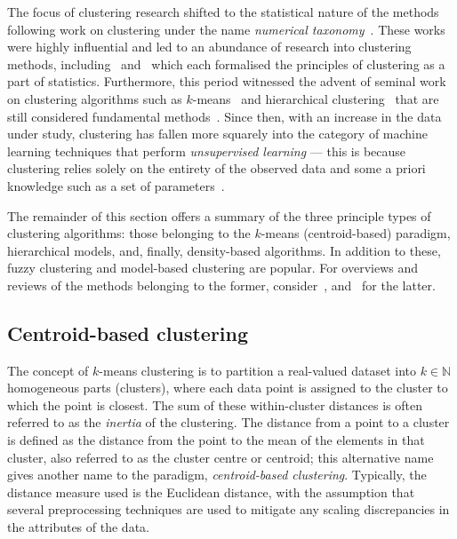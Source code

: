 The focus of clustering research shifted to the statistical nature of the
methods following work on clustering under the name \emph{numerical
taxonomy}~\cite{Sneath1973,Sokal1966}. These works were highly influential and
led to an abundance of research into clustering methods,
including~\cite{Diday1976} and~\cite{Hartigan1975} which each formalised the
principles of clustering as a part of statistics. Furthermore, this period
witnessed the advent of seminal work on clustering algorithms such as
\(k\)-means~\cite{Hartigan1979} and hierarchical
clustering~\cite{Defays1977,Sibson1973} that are still considered fundamental
methods~\cite{Aggarwal2013,Wu2009}. Since then, with an increase in the data
under study, clustering has fallen more squarely into the category of machine
learning techniques that perform \emph{unsupervised learning} --- this is
because clustering relies solely on the entirety of the observed data and some a
priori knowledge such as a set of parameters~\cite{Dayan1999}.

The remainder of this section offers a summary of the three principle types of
clustering algorithms: those belonging to the \(k\)-means (centroid-based)
paradigm, hierarchical models, and, finally, density-based algorithms. In
addition to these, fuzzy clustering and model-based clustering are popular. For
overviews and reviews of the methods belonging to the former,
consider~\cite{Ferraro2019,Gosain2016,Li2016},
and~\cite{Bouveyron2019,Fruhwirth2019,McNicholas2016} for the latter.

\subsection{Centroid-based clustering}\label{subsec:kmeans}

The concept of \(k\)-means clustering is to partition a
real-valued dataset into \(k \in \mathbb N\) homogeneous parts (clusters), where
each data point is assigned to the cluster to which the point is closest. The
sum of these within-cluster distances is often referred to as the \emph{inertia}
of the clustering. The distance from a point to a cluster is defined as the
distance from the point to the mean of the elements in that cluster, also
referred to as the cluster centre or centroid; this alternative name gives
another name to the paradigm, \emph{centroid-based clustering}. Typically, the
distance measure used is the Euclidean distance, with the assumption that
several preprocessing techniques are used to mitigate any scaling discrepancies
in the attributes of the data.

